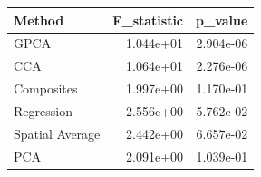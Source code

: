 \begin{tabular}{lrr}
\toprule
Method & F_statistic & p_value \\
\midrule
GPCA & 1.044e+01 & 2.904e-06 \\
CCA & 1.064e+01 & 2.276e-06 \\
Composites & 1.997e+00 & 1.170e-01 \\
Regression & 2.556e+00 & 5.762e-02 \\
Spatial Average & 2.442e+00 & 6.657e-02 \\
PCA & 2.091e+00 & 1.039e-01 \\
\bottomrule
\end{tabular}
